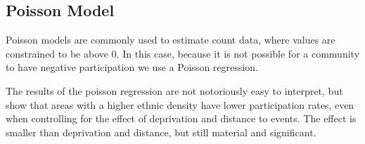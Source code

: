 \documentclass[]{article}
\begin{document}
\newpage

\hypertarget{poisson-model}{%
\subsection{Poisson Model}\label{poisson-model}}

Poisson models are commonly used to estimate count data, where values
are constrained to be above 0. In this case, because it is not possible
for a community to have negative participation we use a Poisson
regression.

The results of the poisson regression are not notoriously easy to
interpret, but show that areas with a higher ethnic density have lower
participation rates, even when controlling for the effect of deprivation
and distance to events. The effect is smaller than deprivation and
distance, but still material and significant.
\end{document}
